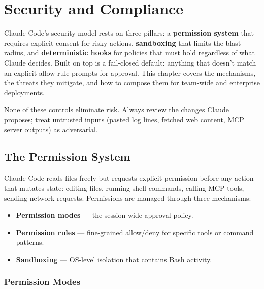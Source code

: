 \chapter{Security and Compliance}
\label{ch:security}


Claude Code's security model rests on three pillars: a \textbf{permission
system} that requires explicit consent for risky actions,
\textbf{sandboxing} that limits the blast radius, and \textbf{deterministic
hooks} for policies that must hold regardless of what Claude decides.
Built on top is a fail-closed default: anything that doesn't match an
explicit allow rule prompts for approval. This chapter covers the
mechanisms, the threats they mitigate, and how to compose them for
team-wide and enterprise deployments.

\begin{warningbox}
None of these controls eliminate risk. Always review the changes Claude
proposes; treat untrusted inputs (pasted log lines, fetched web content,
MCP server outputs) as adversarial.
\end{warningbox}

\section{The Permission System}
\label{sec:permissions}


Claude Code reads files freely but requests explicit permission before any
action that mutates state: editing files, running shell commands, calling
MCP tools, sending network requests. Permissions are managed through three
mechanisms:

\begin{itemize}
  \item \textbf{Permission modes} — the session-wide approval policy.
  \item \textbf{Permission rules} — fine-grained allow/deny for specific
        tools or command patterns.
  \item \textbf{Sandboxing} — OS-level isolation that contains Bash
        activity.
\end{itemize}

\subsection{Permission Modes}

